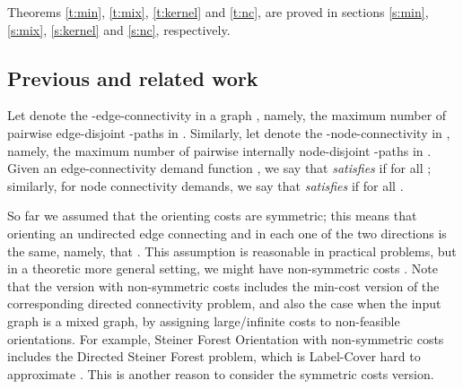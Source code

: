 \documentclass[envcountsame]{llncs}
\begin{document}
Theorems \ref{t:min}, \ref{t:mix}, \ref{t:kernel} and \ref{t:nc}, 
are proved in
sections \ref{s:min}, \ref{s:mix}, \ref{s:kernel} and \ref{s:nc}, 
respectively.


\subsection{Previous and related work}

Let  denote the -edge-connectivity in a graph ,
namely, the ma\-xi\-mum number of pairwise edge-disjoint -paths in .
Similarly, let  denote the -node-connectivity in , 
namely, the maximum number of pairwise internally node-disjoint -paths in .
Given an edge-connectivity demand function , we say that 
 {\em satisfies}  if  for all ; similarly, 
for node connectivity demands, we say that  {\em satisfies}  
if  for all .

\vspace{0.1cm}

\begin{center} 
\end{center}

\vspace{0.1cm}

So far we assumed that the orienting costs are symmetric; 
this means that orienting an undirected edge connecting  and  
in each one of the two directions is the same, namely, that .
This assumption is reasonable in practical problems,  
but in a theoretic more general setting, we might have non-symmetric costs .
Note that the version with non-symmetric costs includes the min-cost version 
of the corresponding directed connectivity problem, and also the case when the input graph 
 is a mixed graph, by assigning large/infinite costs to non-feasible orientations.
For example, {\sf Steiner Forest Orientation} with non-symmetric costs 
includes the {\sf Directed Steiner Forest} problem,
which is {\sf Label-Cover} hard to approximate \cite{DK}.
This is another reason to consider the symmetric costs version.
\end{document}
